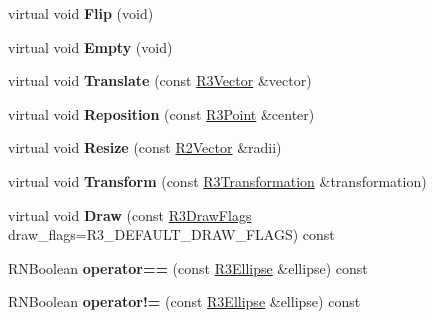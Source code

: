 \begin{DoxyCompactItemize}
\item 
virtual void {\bfseries Flip} (void)\hypertarget{class_r3_ellipse_a369f5fbb7ba3a4dd5f4c1c080bb01b8e}{}\label{class_r3_ellipse_a369f5fbb7ba3a4dd5f4c1c080bb01b8e}

\item 
virtual void {\bfseries Empty} (void)\hypertarget{class_r3_ellipse_a6889ccaf530bbdd1fd15e91a077d7a63}{}\label{class_r3_ellipse_a6889ccaf530bbdd1fd15e91a077d7a63}

\item 
virtual void {\bfseries Translate} (const \hyperlink{class_r3_vector}{R3\+Vector} \&vector)\hypertarget{class_r3_ellipse_a3a23e824f5e03ae03b4da1110535ab4b}{}\label{class_r3_ellipse_a3a23e824f5e03ae03b4da1110535ab4b}

\item 
virtual void {\bfseries Reposition} (const \hyperlink{class_r3_point}{R3\+Point} \&center)\hypertarget{class_r3_ellipse_aacb7dab591134033f037114f816f274a}{}\label{class_r3_ellipse_aacb7dab591134033f037114f816f274a}

\item 
virtual void {\bfseries Resize} (const \hyperlink{class_r2_vector}{R2\+Vector} \&radii)\hypertarget{class_r3_ellipse_a1aaf1103c9097158ff96a686453b0fde}{}\label{class_r3_ellipse_a1aaf1103c9097158ff96a686453b0fde}

\item 
virtual void {\bfseries Transform} (const \hyperlink{class_r3_transformation}{R3\+Transformation} \&transformation)\hypertarget{class_r3_ellipse_a8deb2166b46d47f1934649a63cec96b4}{}\label{class_r3_ellipse_a8deb2166b46d47f1934649a63cec96b4}

\item 
virtual void {\bfseries Draw} (const \hyperlink{class_r_n_flags}{R3\+Draw\+Flags} draw\+\_\+flags=R3\+\_\+\+D\+E\+F\+A\+U\+L\+T\+\_\+\+D\+R\+A\+W\+\_\+\+F\+L\+A\+GS) const \hypertarget{class_r3_ellipse_a50d573e9ee55905bb12dfc5f280d2899}{}\label{class_r3_ellipse_a50d573e9ee55905bb12dfc5f280d2899}

\item 
R\+N\+Boolean {\bfseries operator==} (const \hyperlink{class_r3_ellipse}{R3\+Ellipse} \&ellipse) const \hypertarget{class_r3_ellipse_a0ca217104034628b97a4690d858e0cfd}{}\label{class_r3_ellipse_a0ca217104034628b97a4690d858e0cfd}

\item 
R\+N\+Boolean {\bfseries operator!=} (const \hyperlink{class_r3_ellipse}{R3\+Ellipse} \&ellipse) const \hypertarget{class_r3_ellipse_a557c2502cca97e24899e6b4cd7fa3e12}{}\label{class_r3_ellipse_a557c2502cca97e24899e6b4cd7fa3e12}


\end{DoxyCompactItemize}
